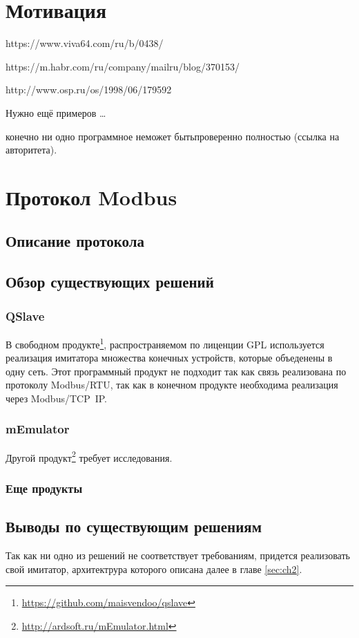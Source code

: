 \chapter{Мотивация}

https://www.viva64.com/ru/b/0438/

https://m.habr.com/ru/company/mailru/blog/370153/

http://www.osp.ru/os/1998/06/179592

Нужно ещё примеров \ldots

конечно ни одно программное неможет бытьпроверенно полностью (ссылка на авторитета).

\chapter{Протокол Modbus}\label{ch:ch1}

\section{Описание протокола}

\section{Обзор существующих решений}\label{sec:ch1/sec1}
\subsection{QSlave}

В свободном продукте\footnote{\url{https://github.com/maisvendoo/qslave}}, распространяемом по лиценции GPL используется
реализация имитатора множества конечных устройств, которые объеденены в одну сеть.
Этот программный продукт не подходит так как связь реализована по протоколу
Modbus/RTU, так как в конечном продукте необходима реализация через Modbus/TCP~IP.

\subsection{mEmulator}
Другой продукт\footnote{\url{http://ardsoft.ru/mEmulator.html}} требует исследования.


\subsection{Еще продукты}


\section{Выводы по существующим решениям}

Так как ни одно из решений не соответствует требованиям, придется реализовать свой
имитатор, архитектрура которого описана далее в главе \ref{sec:ch2}.
